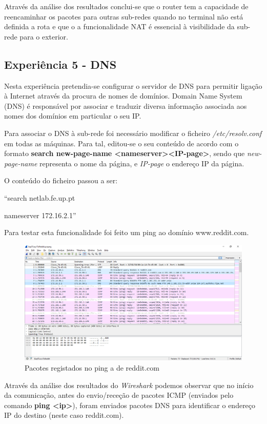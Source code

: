 \documentclass[a4paper, 11pt]{article}
\begin{document}
Através da análise dos resultados conclui-se que o router tem a capacidade de reencaminhar os pacotes para outras sub-redes quando no terminal não está definida a rota e que o a funcionalidade NAT é essencial à visibilidade da sub-rede para o exterior. 

\subsection{Experiência 5 - DNS}
Nesta experiência pretendia-se configurar o servidor de DNS para permitir ligação à Internet através da procura de nomes de domínios. Domain Name System (DNS) é responsável por associar e traduzir diversa informação associada aos nomes dos domínios em particular o seu IP.

Para associar o DNS à sub-rede foi necessário modificar o ficheiro \textit{/etc/resolv.conf} em todas as máquinas. Para tal, editou-se o seu conteúdo de acordo com o formato \textbf{search new-page-name  \textless nameserver\textgreater  \textless IP-page\textgreater}, sendo que \textit{new-page-name} representa o nome da página, e \textit{IP-page} o endereço IP da página.

O conteúdo do ficheiro passou a ser:

“search netlab.fe.up.pt 

 nameserver 172.16.2.1”

Para testar esta funcionalidade foi feito um ping ao domínio www.reddit.com.
\begin{figure}[h]
\centering
\includegraphics[scale=0.4]{images/Exp5_dns_packets.png}
\caption{Pacotes registados no ping a de reddit.com}
\label{Momentanpol}
\end{figure}

Através da análise dos resultados do \textit{Wireshark} podemos observar que no início da comunicação, antes do envio/receção de pacotes ICMP (enviados pelo comando \textbf{ping \textless ip\textgreater }), foram enviados pacotes DNS para identificar o endereço IP do destino (neste caso reddit.com). 
\end{document}

